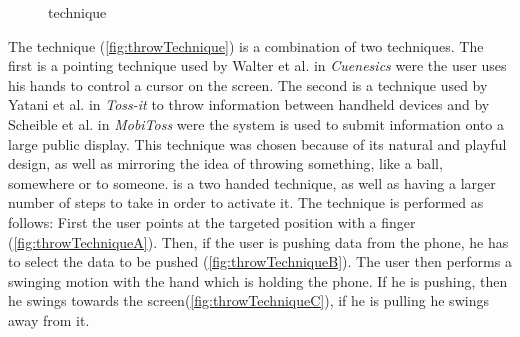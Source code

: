 \begin{figure}[H]
	\caption{\push \swipe technique}
	\label{fig:swipeTechnique}
\end{figure}

The \throw technique (\cref{fig:throwTechnique}) is a combination of two techniques.
The first is a pointing technique used by Walter et al. in \emph{Cuenesics} \cite{Walter:2014} were the user uses his hands to control a cursor on the screen.
The second is a technique used by Yatani et al. \cite{Yatani:2005} in \emph{Toss-it} to throw information between handheld devices and by Scheible et al. in \emph{MobiToss} \cite{Scheible:2008} were the system is used to submit information onto a large public display.
This technique was chosen because of its natural and playful design, as well as mirroring the idea of throwing something, like a ball, somewhere or to someone.
\throw is a two handed technique, as well as having a larger number of steps to take in order to activate it.
The \throw technique is performed as follows: 
First the user points at the targeted position with a finger (\cref{fig:throwTechniqueA}).
Then, if the user is pushing data from the phone, he has to select the data to be pushed (\cref{fig:throwTechniqueB}).
The user then performs a swinging motion with the hand which is holding the phone.
If he is pushing, then he swings towards the screen(\cref{fig:throwTechniqueC}), if he is pulling he swings away from it. 


